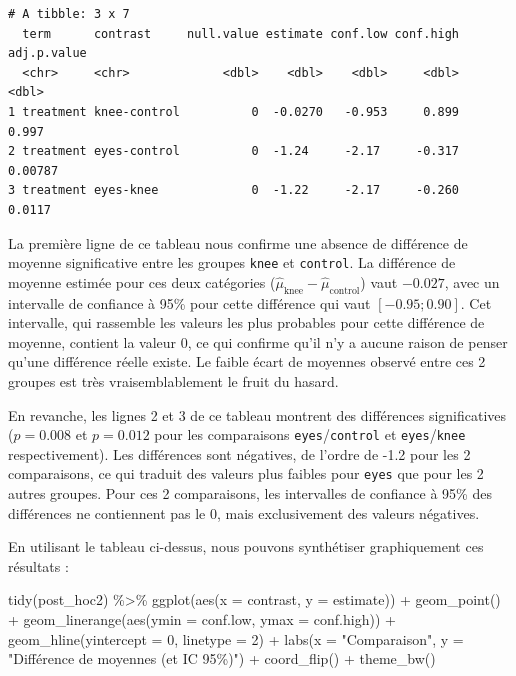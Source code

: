 \documentclass[
  a4paper,
]{article}
\newenvironment{Shaded}{\begin{snugshade}}{\end{snugshade}}
\newcommand{\AttributeTok}[1]{\textcolor[rgb]{0.00,0.34,0.68}{#1}}
\newcommand{\DecValTok}[1]{\textcolor[rgb]{0.69,0.50,0.00}{#1}}
\newcommand{\FunctionTok}[1]{\textcolor[rgb]{0.39,0.29,0.61}{#1}}
\newcommand{\NormalTok}[1]{\textcolor[rgb]{0.12,0.11,0.11}{#1}}
\newcommand{\SpecialCharTok}[1]{\textcolor[rgb]{0.24,0.68,0.91}{#1}}
\newcommand{\StringTok}[1]{\textcolor[rgb]{0.75,0.01,0.01}{#1}}
\begin{document}
\begin{verbatim}
# A tibble: 3 x 7
  term      contrast     null.value estimate conf.low conf.high adj.p.value
  <chr>     <chr>             <dbl>    <dbl>    <dbl>     <dbl>       <dbl>
1 treatment knee-control          0  -0.0270   -0.953     0.899     0.997  
2 treatment eyes-control          0  -1.24     -2.17     -0.317     0.00787
3 treatment eyes-knee             0  -1.22     -2.17     -0.260     0.0117 
\end{verbatim}

La première ligne de ce tableau nous confirme une absence de différence de moyenne significative entre les groupes \texttt{knee} et \texttt{control}. La différence de moyenne estimée pour ces deux catégories (\(\hat{\mu}_{\textrm{knee}} - \hat{\mu}_{\textrm{control}}\)) vaut \(-0.027\), avec un intervalle de confiance à 95\% pour cette différence qui vaut \([-0.95 ; 0.90]\). Cet intervalle, qui rassemble les valeurs les plus probables pour cette différence de moyenne, contient la valeur 0, ce qui confirme qu'il n'y a aucune raison de penser qu'une différence réelle existe. Le faible écart de moyennes observé entre ces 2 groupes est très vraisemblablement le fruit du hasard.

En revanche, les lignes 2 et 3 de ce tableau montrent des différences significatives (\(p = 0.008\) et \(p = 0.012\) pour les comparaisons \texttt{eyes}/\texttt{control} et \texttt{eyes}/\texttt{knee} respectivement). Les différences sont négatives, de l'ordre de -1.2 pour les 2 comparaisons, ce qui traduit des valeurs plus faibles pour \texttt{eyes} que pour les 2 autres groupes. Pour ces 2 comparaisons, les intervalles de confiance à 95\% des différences ne contiennent pas le 0, mais exclusivement des valeurs négatives.

En utilisant le tableau ci-dessus, nous pouvons synthétiser graphiquement ces résultats :

\begin{Shaded}
\begin{Highlighting}[]
\FunctionTok{tidy}\NormalTok{(post\_hoc2) }\SpecialCharTok{\%\textgreater{}\%} 
  \FunctionTok{ggplot}\NormalTok{(}\FunctionTok{aes}\NormalTok{(}\AttributeTok{x =}\NormalTok{ contrast, }\AttributeTok{y =}\NormalTok{ estimate)) }\SpecialCharTok{+}
  \FunctionTok{geom\_point}\NormalTok{() }\SpecialCharTok{+} 
  \FunctionTok{geom\_linerange}\NormalTok{(}\FunctionTok{aes}\NormalTok{(}\AttributeTok{ymin =}\NormalTok{ conf.low, }\AttributeTok{ymax =}\NormalTok{ conf.high)) }\SpecialCharTok{+}
  \FunctionTok{geom\_hline}\NormalTok{(}\AttributeTok{yintercept =} \DecValTok{0}\NormalTok{, }\AttributeTok{linetype =} \DecValTok{2}\NormalTok{) }\SpecialCharTok{+}
  \FunctionTok{labs}\NormalTok{(}\AttributeTok{x =} \StringTok{"Comparaison"}\NormalTok{,}
       \AttributeTok{y =} \StringTok{"Différence de moyennes (et IC 95\%)"}\NormalTok{) }\SpecialCharTok{+}
  \FunctionTok{coord\_flip}\NormalTok{() }\SpecialCharTok{+}
  \FunctionTok{theme\_bw}\NormalTok{()}
\end{Highlighting}
\end{Shaded}
\end{document}
